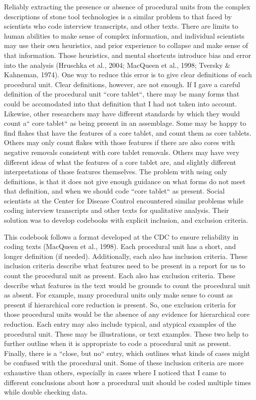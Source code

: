 \documentclass[
]{article}
\begin{document}
Reliably extracting the presence or absence of procedural units from the
complex descriptions of stone tool technologies is a similar problem to
that faced by scientists who code interview transcripts, and other
texts. There are limits to human abilities to make sense of complex
information, and individual scientists may use their own heuristics, and
prior experience to collapse and make sense of that information. Those
heuristics, and mental shortcuts introduce bias and error into the
analysis (Hruschka et al., 2004; MacQueen et al., 1998; Tversky \&
Kahneman, 1974). One way to reduce this error is to give clear
definitions of each procedural unit. Clear definitions, however, are not
enough. If I gave a careful definition of the procedural unit ``core
tablet``, there may be many forms that could be accomodated into that
definition that I had not taken into account. Likewise, other
researchers may have different standards by which they would count a``
core tablet`` as being present in an assemblage. Some may be happy to
find flakes that have the features of a core tablet, and count them as
core tablets. Others may only count flakes with those features if there
are also cores with negative removals consistent with core tablet
removals. Others may have very different ideas of what the features of a
core tablet are, and slightly different interpretations of those
features themselves. The problem with using only definitions, is that it
does not give enough guidance on what forms do not meet that definition,
and when we should code ``core tablet`` as present. Social scientists at
the Center for Disease Control encountered similar problems while coding
interview transcripts and other texts for qualitative analysis. Their
solution was to develop codebooks with explicit inclusion, and exclusion
criteria.

This codebook follows a format developed at the CDC to ensure
reliability in coding texts (MacQueen et al., 1998). Each procedural
unit has a short, and longer definition (if needed). Additionally, each
also has inclusion criteria. These inclusion criteria describe what
features need to be present in a report for us to count the procedural
unit as present. Each also has exclusion criteria. These describe what
features in the text would be grounds to count the procedural unit as
absent. For example, many procedural units only make sense to count as
present if hierarchical core reduction is present. So, one exclusion
criteria for those procedural units would be the absence of any evidence
for hierarchical core reduction. Each entry may also include typical,
and atypical examples of the procedural unit. These may be
illustrations, or text examples. These two help to further outline when
it is appropriate to code a procedural unit as present. Finally, there
is a ``close, but no`` entry, which outlines what kinds of cases might
be confused with the procedural unit. Some of these inclusion criteria
are more exhaustive than others, especially in cases where I noticed
that I came to different conclusions about how a procedural unit should
be coded multiple times while double checking data.
\end{document}
